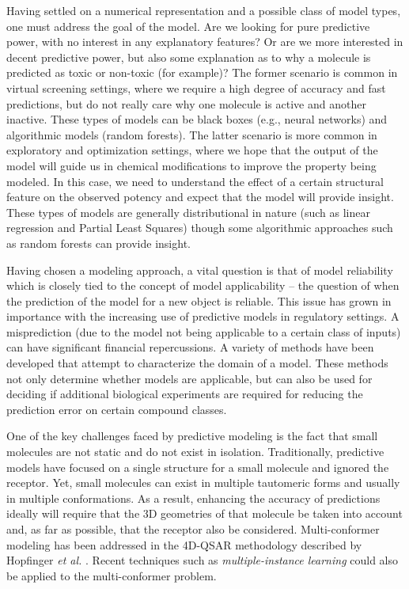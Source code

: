 \documentclass{sig-alternate}
\begin{document}
Having settled on a numerical representation and a possible class of
model types, one must address the goal of the model. Are we
looking for pure predictive power, with no interest in any explanatory
features? Or are we more interested in decent predictive power, but
also some explanation as to why a molecule is predicted as toxic or
non-toxic (for example)? The former scenario is common in virtual
screening settings, where we require a high degree of accuracy and fast
predictions, but do not really care why one molecule is active
and another inactive. These types of models can be black boxes (e.g., neural
networks) and algorithmic models \cite{Breiman:2001fk} (random
forests). The latter scenario is more common in exploratory and
optimization settings, where we hope that the output of the model will
guide us in chemical modifications to improve the property being
modeled.  In this case, we need to understand the effect of a
certain structural feature on the observed potency and expect that the
model will provide insight. These types of models are generally
distributional in nature (such as linear regression and Partial Least Squares) though
some algorithmic approaches such as random forests can provide insight.

Having chosen a modeling approach, a vital question is that of model
reliability which is closely tied to the concept of model
applicability -- the question of when the prediction of the model for
a new object is reliable. This issue has grown in importance with the
increasing use of predictive models in regulatory settings. A
misprediction (due to the model not being applicable to a certain class
of inputs) can have significant financial repercussions. A variety of
methods have been developed that attempt to characterize the domain of
a model. These methods not only determine whether models are
applicable, but can also be used for deciding if additional biological
experiments are required for reducing the prediction error on certain
compound classes.

One of the key challenges faced by predictive modeling is the fact
that small molecules are not static and do not exist in isolation.
Traditionally, predictive models have focused on a single
structure for a small molecule and ignored the receptor. Yet, small molecules can
exist in multiple tautomeric forms and usually in multiple
conformations. As a result, enhancing the accuracy of predictions
ideally will require that the 3D geometries of that molecule be taken
into account and, as far as possible, that the receptor also be considered.
Multi-conformer modeling has been addressed in the
4D-QSAR methodology described by Hopfinger \textit{et al.}
\cite{Albuquerque:1998ys}.  Recent techniques such as
\emph{multiple-instance learning} could also be applied to the
multi-conformer problem.
\end{document}
